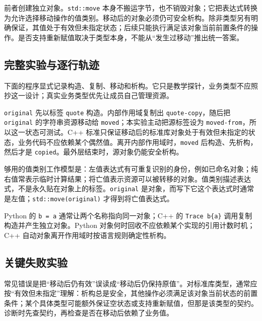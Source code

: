 前者创建独立对象。\texttt{std::move} 本身不搬运字节，也不销毁对象；它把表达式转换为允许选择移动操作的值类别。移动后的对象必须仍可安全析构。除非类型另有明确保证，其值处于有效但未指定状态；后续只能执行满足该对象当前前置条件的操作。是否支持重新赋值取决于类型本身，不能从“发生过移动”推出统一答案。

\subsection{完整实验与逐行轨迹}

下面的程序显式记录构造、复制、移动和析构。它只是教学探针，业务类型不应照抄这一设计；真实业务类型优先让成员自己管理资源。



\texttt{original} 先以标签 \texttt{quote} 构造。内部作用域复制出 \texttt{quote-copy}，随后把 \texttt{original} 的字符串资源移动给 \texttt{moved}；本实验主动把源标签设为 \texttt{moved-from}，所以这一状态可测试。C++ 标准只保证移动后的标准库对象处于有效但未指定的状态，业务代码不应依赖某个偶然值\autocite{cppdraft}。离开内部作用域时，\texttt{moved} 后构造、先析构，然后才是 \texttt{copied}。最外层结束时，源对象仍能安全析构。

够用的值类别工作模型是：左值表达式有可重复识别的身份，例如已命名对象；纯右值常表示临时计算结果；将亡值表示资源可以被转移的对象。值类别描述表达式，不是永久贴在对象上的标签。\texttt{original} 是对象，而写下它这个表达式时通常是左值；\texttt{std::move(original)} 才得到将亡值表达式。

\begin{pythonbridge}
Python 的 \texttt{b = a} 通常让两个名称指向同一对象；C++ 的 \texttt{Trace b\{a\}} 调用复制构造并产生独立对象。Python 对象何时回收不应依赖某个实现的引用计数时机；C++ 自动对象离开作用域时按语言规则确定性析构。

\end{pythonbridge}

\subsection{关键失败实验}

常见错误是把“移动后仍有效”误读成“移动后仍保持原值”。对标准库类型，通常应按“有效但未指定”理解：析构总是安全，其他操作必须满足该对象当前状态的前置条件；某个具体类型可能额外保证空状态或支持重新赋值，但那是该类型的契约。诊断时先查契约，再检查是否在移动后依赖了业务值。

